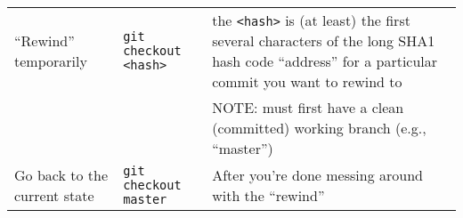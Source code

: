 \documentclass[]{article}
\begin{document}
\begin{center}
\begin{tabular}{llp{2.5in}}
 ``Rewind'' temporarily        &  \texttt{git checkout <hash>}                     &  the \texttt{<hash>} is (at least) the first several characters of the long SHA1 hash code ``address'' for a particular commit you want to rewind to                    \\
                               &                                                   &  NOTE: must first have a clean (committed) working branch (e.g., ``master'')                                                                                            \\
 Go back to the current state  &  \texttt{git checkout master}                     &  After you're done messing around with the ``rewind''                                                                                                                   \\
\end{tabular}
\end{center}



  
\end{document}
